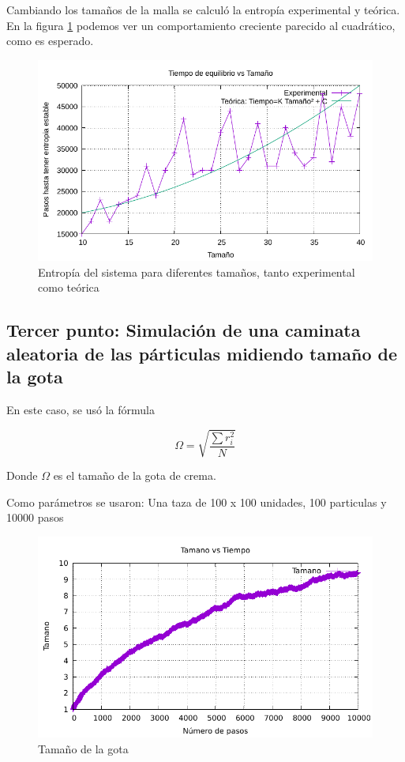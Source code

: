 \documentclass{article}
\begin{document}
\begin{multicols}{2}
Cambiando los tamaños de la malla se calculó la entropía experimental y teórica. En la figura \ref{Entropia_varios_tamaños}  podemos ver un comportamiento creciente parecido al cuadrático, como es esperado.

\begin{figure}[H]
    \centering
    \includegraphics[width=\columnwidth]{punto_2.pdf}
    \caption{Entropía del sistema para diferentes tamaños, tanto experimental como teórica}
    \label{Entropia_varios_tamaños}
\end{figure}

\subsection*{Tercer punto: Simulación de una caminata aleatoria de las párticulas midiendo tamaño de la gota}

En este caso, se usó la fórmula

\begin{equation}
    \Omega = \sqrt{\frac{\sum r_i^2}{N}}
\end{equation}

Donde $\Omega$ es el tamaño de la gota de crema. 

Como parámetros se usaron: Una taza de 100 x 100 unidades, 100 particulas y 10000 pasos



\begin{figure}[H]
    \centering
    \includegraphics[width=\columnwidth]{punto_3.pdf}
    \caption{Tamaño de la gota}
    \label{tamaño_gota}
\end{figure}


\end{multicols}
\end{document}
